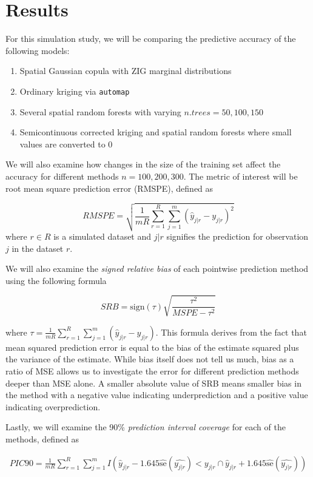 \documentclass{article}
\begin{document}
\section{Results}
For this simulation study, we will be comparing the predictive accuracy of the following models: \begin{enumerate}
	\item Spatial Gaussian copula with ZIG marginal distributions
	\item Ordinary kriging via \texttt{automap}
	\item Several spatial random forests with varying $n.trees = 50, 100, 150$
	\item Semicontinuous corrected kriging and spatial random forests where small values are converted to 0
\end{enumerate}

We will also examine how changes in the size of the training set affect the accuracy for different methods $n = 100, 200, 300$.
The metric of interest will be root mean square prediction error (RMSPE), defined as

$$
RMSPE = \sqrt{\frac{1}{mR} \sum_{r=1}^R \sum_{j=1}^m (\hat{y}_{j|r} - y_{j|r})^2}
$$
where $r \in R$ is a simulated dataset and $j|r$ signifies the prediction for observation $j$ in the dataset $r$.

We will also examine the \textit{signed relative bias} of each pointwise prediction method using the following formula\cite{verhoef13}

$$
SRB = \text{sign}(\tau) \sqrt{\frac{\tau^2}{MSPE - \tau^2}}
$$

where $\tau = \frac{1}{mR} \sum_{r = 1}^R \sum_{j = 1}^m (\hat{y}_{j|r} - y_{j|r})$.
This formula derives from the fact that mean squared prediction error is equal to the bias of the estimate squared plus the variance of the estimate.
While bias itself does not tell us much, bias as a ratio of MSE allows us to investigate the error for different prediction methods deeper than MSE alone.
A smaller absolute value of SRB means smaller bias in the method with a negative value indicating underprediction and a positive value indicating overprediction.

Lastly, we will examine the 90\% \textit{prediction interval coverage} for each of the methods, defined as

\begin{align*}
	PIC90 = \frac{1}{mR} \sum_{r=1}^R \sum_{j=1}^m I\left(\hat{y}_{j|r} - 1.645\hat{\text{se}}(\hat{y_{j|r}}) < y_{j|r} \cap \hat{y}_{j|r} + 1.645\hat{\text{se}}(\hat{y_{j|r}})\right)
\end{align*}
\end{document}

